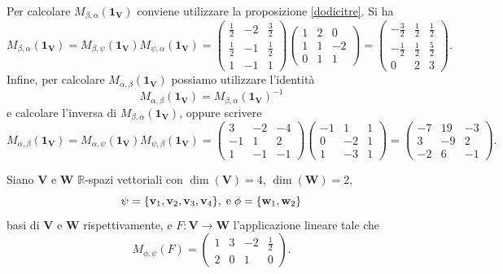\documentclass{article}
\theoremstyle{plain}
\theoremstyle{definition}
\theoremstyle{remark}
\begin{document}
Per calcolare $M_{\beta,\alpha}(\mathbf{1_V})$ conviene utilizzare la proposizione \ref{dodicitre}. 
Si ha
\[M_{\beta,\alpha}(\mathbf{1_V}) = M_{\beta,\psi}(\mathbf{1_V})M_{\psi,\alpha}(\mathbf{1_V}) =\begin{pmatrix} \frac{1}{2} & -2 & \frac{3}{2} \\ \frac{1}{2} & -1 & \frac{1}{2} \\ 1 & -1 & 1 \end{pmatrix} \begin{pmatrix} 1 & 2 & 0 \\ 1 & 1 & -2 \\ 0 & 1 & 1 \end{pmatrix} = \begin{pmatrix} -\frac{3}{2} & \frac{1}{2} & \frac{1}{2} \\ -\frac{1}{2} & \frac{1}{2} & \frac{5}{2} \\ 0 & 2 & 3 \end{pmatrix}.\]
Infine, per calcolare $M_{\alpha,\beta}(\mathbf{1_V})$ possiamo utilizzare l'identità
\[M_{\alpha,\beta}(\mathbf{1_V}) = M_{\beta,\alpha}(\mathbf{1_V})^{-1}\]
e calcolare l'inversa di $M_{\beta,\alpha}(\mathbf{1_V})$, oppure scrivere
\[M_{\alpha,\beta}(\mathbf{1_V}) = M_{\alpha,\psi}(\mathbf{1_V})M_{\psi,\beta}(\mathbf{1_V}) =\begin{pmatrix} 3 & -2 & -4 \\ -1 & 1 & 2 \\ 1 & -1 & -1 \end{pmatrix} \begin{pmatrix} -1 & 1 & 1 \\ 0 & -2 & 1 \\ 1 & -3 & 1 \end{pmatrix} = \begin{pmatrix} -7 & 19 & -3 \\ 3 & -9 & 2 \\ -2 & 6 & -1 \end{pmatrix}.\]

\vspace{10pt}

Siano $\mathbf{V}$ e $\mathbf{W}$ $\mathbb{R}$-spazi vettoriali con $\dim(\mathbf{V}) = 4,\,\dim(\mathbf{W}) = 2$, 
\[\psi = \{\mathbf{v}_1, \mathbf{v}_2, \mathbf{v}_3, \mathbf{v}_4\},\;\textup{e}\;\phi = \{\mathbf{w}_1, \mathbf{w}_2\}\]
basi di $\mathbf{V}$ e $\mathbf{W}$ rispettivamente, e $F: \mathbf{V} \to \mathbf{W}$ l'applicazione lineare tale che
\[M_{\phi,\psi}(F) = \begin{pmatrix} 1 & 3 & -2 & \frac{1}{2} \\ 2 & 0 & 1 & 0 \end{pmatrix}.\]
\end{document}
